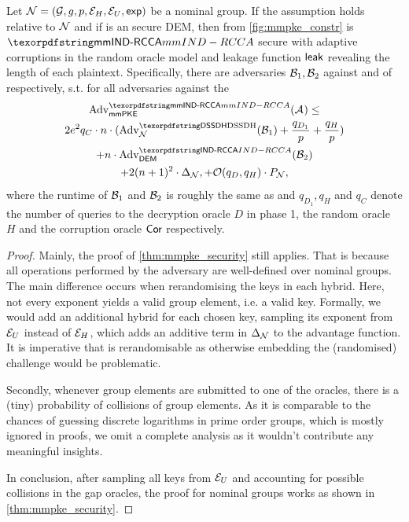 \begin{theorem}
  Let $\ngroup = (\nG, g, p, \nGE, \nGU, \nGexp)$ be a nominal group.
  If the \sdh assumption holds relative to  $\ngroup$ and if \dem is an \indrcca secure DEM, then \mmPKE from
  \cref{fig:mmpke_constr} is $\mmindrcca$ secure with adaptive corruptions in the random oracle model and leakage
  function $\leak$ revealing the length of each plaintext. Specifically, there are adversaries $\Bdv[1],\Bdv[2]$ against
  \sdh and \indrcca of \dem respectively, s.t. for all adversaries \Adv against the \mmindrcca
  \begin{multline*}
    \adv{\mmindrcca}{\mmPKE}({\Adv}) \leq \\2e^2q_C\cdot n\cdot(\adv{\sdh}{\ngroup}({\Bdv[1]}) +
                                       \frac{q_{D_1}}{p} + \frac{q_{H}}{p}) \\ + n \cdot \adv{\indrcca}{\dem}({\Bdv[2]}) 
    \\+ 2(n+1)^2\cdot\Delta_{\ngroup}, + \mathcal{O}(q_D, q_H)\cdot P_{\ngroup},
  \end{multline*}
  where the runtime of $\Bdv[1]$ and $\Bdv[2]$ is roughly the same as \Adv and $q_{D_1},q_H$ and $q_C$ denote the number of queries to the decryption oracle $D$ in phase 1, the random oracle
  $H$ and the corruption oracle $\term{Cor}$ respectively.
\end{theorem}

\begin{proof}
  Mainly, the proof of \cref{thm:mmpke_security} still applies. That is because all operations performed by the
  adversary are well-defined over nominal groups. The main difference occurs when rerandomising the keys in each 
  hybrid. Here, not every exponent yields a valid group element, i.e. a valid key. Formally, we would add an additional
  hybrid for each chosen key, sampling its exponent from $\nGU$ instead of $\nGE$, which adds an additive term in $\Delta_{\ngroup}$ to
  the advantage function. It is imperative that \ngroup is rerandomisable as otherwise embedding the (randomised)
  challenge would be problematic.
  
  Secondly, whenever group elements are submitted to one of the oracles, there is a (tiny) probability of collisions of
  group elements. As it is comparable to the chances of guessing discrete logarithms in prime order groups, which is
  mostly ignored in proofs, we omit a complete analysis as it wouldn't contribute any meaningful insights.

  In conclusion, after sampling all keys from $\nGU$ and accounting for possible collisions in the gap oracles, the
  proof for nominal groups works as shown in \cref{thm:mmpke_security}.
\end{proof}


